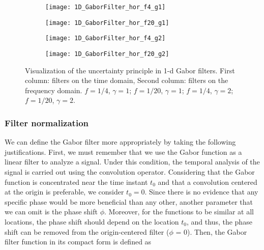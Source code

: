 \begin{figure}[!ht] 

	\centering
	\begin{subfigure}[t]{\textwidth+20pt\relax}
    	\texttt{[image: 1D\_GaborFilter\_hor\_f4\_g1]}
    \end{subfigure}\vspace{-1em}
	\begin{subfigure}[t]{\textwidth+20pt\relax}
    	\texttt{[image: 1D\_GaborFilter\_hor\_f20\_g1]}
    \end{subfigure}\vspace{-1em}
	\begin{subfigure}[t]{\textwidth+20pt\relax}
    	\texttt{[image: 1D\_GaborFilter\_hor\_f4\_g2]}
    \end{subfigure}\vspace{-1em}
	\begin{subfigure}[t]{\textwidth+20pt\relax}
    	\texttt{[image: 1D\_GaborFilter\_hor\_f20\_g2]}
    \end{subfigure}\vspace{-1em}
	
  	\caption{Visualization of the uncertainty principle in 1-d Gabor filters. First column: filters on the time domain, Second column: filters on the frequency domain.  $f = 1/4$, $\gamma = 1$;  $f = 1/20$, $\gamma = 1$;  $f = 1/4$, $\gamma = 2$;  $f = 1/20$, $\gamma = 2$.}
  \label{fig:examples_1D_GaborFilter}
\end{figure}

\subsubsection{Filter normalization} \label{subsec:filter_normalization}
We can define the Gabor filter more appropriately by taking the following justifications. First, we must remember that we use the Gabor function as a linear filter to analyze a signal. Under this condition, the temporal analysis of the signal is carried out using the convolution operator. Considering that the Gabor function is concentrated near the time instant $t_0$ and that a convolution centered at the origin is preferable, we consider $t_0 = 0$. Since there is no evidence that any specific phase would be more beneficial than any other, another parameter that we can omit is the phase shift $\phi$. Moreover, for the functions to be similar at all locations, the phase shift should depend on the location $t_0$, and thus, the phase shift can be removed from the origin-centered filter ($\phi$ = 0). Then, the Gabor filter function in its compact form is defined as 

